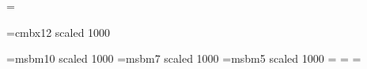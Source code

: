 \magnification=
\overfullrule=0pt

\font\twelvebf=cmbx12 scaled 1000

\font\tenmsb=msbm10 scaled 1000
\font\sevenmsb=msbm7 scaled 1000
\font\fivemsb=msbm5 scaled 1000
\newfam\msbfam
\textfont\msbfam=\tenmsb
\scriptfont\msbfam=\sevenmsb
\scriptscriptfont\msbfam=\fivemsb
\def\Bbb#1{{\fam\msbfam\relax#1}}

\def\N{{\Bbb N}}
\def\E{{\Bbb E}}
\def\R{{\Bbb R}}
\def\Q{{\Bbb Q}}
\def\C{{\Bbb C}}
\def\cC{{\cal C}}
\def\cF{{\cal F}}
\def\cG{{\cal G}}
\def\cM{{\cal M}}
\def\cS{{\cal S}}
\def\cT{{\cal T}}
\def\cU{{\cal U}}
\def\cL{{\cal L}}

\def\ae{\quad\hbox{almost everywhere}}
\def\as{\quad\hbox{almost surely}}

\def\approxsb#1{\mathrel{\mathop{\approx}\limits_{#1}}}

\def\modo#1{{\left|#1\right|}}
\def\normo#1{{\left\|#1\right\|}}
\def\smodo#1{{\mathopen|#1\mathclose|}}
\def\snormo#1{{\mathopen\|#1\mathclose\|}}

\def\QED{\par\hfill Q.E.D.}

\def\Proof:{\medskip\noindent{\bf Proof:}\ \ } 
\def\Proofof#1:{\medskip\noindent{\bf Proof of #1:}\ \ }

\def\moreproclaim{\par}

